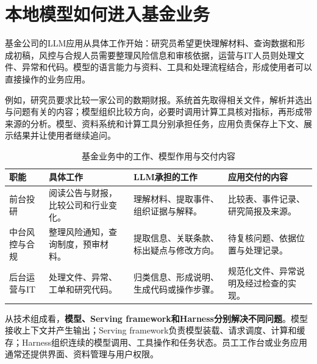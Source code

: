 \section{本地模型如何进入基金业务}

基金公司的LLM应用从具体工作开始：研究员希望更快理解材料、查询数据和形成初稿，风控与合规人员需要整理风险信息和审核依据，运营与IT人员则处理文件、异常和代码。模型的语言能力与资料、工具和处理流程结合，形成使用者可以直接操作的业务应用。

例如，研究员要求比较一家公司的数期财报。系统首先取得相关文件，解析并选出与问题有关的内容；模型组织比较方向，必要时调用计算工具核对指标，再形成带来源的分析。模型、资料系统和计算工具分别承担任务，应用负责保存上下文、展示结果并让使用者继续追问。

\begin{table}[H]\small\centering
\caption{基金业务中的工作、模型作用与交付内容}
\begin{tabularx}{\linewidth}{@{}P{22mm}Y Y Y@{}}\toprule
职能 & 具体工作 & LLM承担的工作 & 应用交付的内容\\\midrule
前台投研 & 阅读公告与财报，比较公司和行业变化。 & 理解材料、提取事件、组织证据与解释。 & 比较表、事件记录、研究简报及来源。\\
中台风控与合规 & 整理风险通知，查询制度，预审材料。 & 提取信息、关联条款、标出疑点与修改方向。 & 待复核问题、依据位置与处理记录。\\
后台运营与IT & 处理文件、异常、工单和研究代码。 & 归类信息、形成说明、生成代码或操作步骤。 & 规范化文件、异常说明及经过检查的实现。\\\bottomrule
\end{tabularx}
\end{table}

从技术组成看，\textbf{模型、Serving framework和Harness分别解决不同问题}。模型接收上下文并产生输出；Serving framework负责模型装载、请求调度、计算和缓存；Harness组织连续的模型调用、工具操作和任务状态。员工工作台或业务应用通常还提供界面、资料管理与用户权限。


